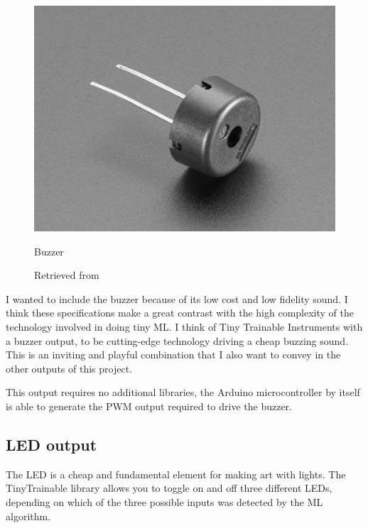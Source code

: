 \begin{figure}[ht]
  \centering
  \includegraphics[width=0.75\linewidth,height=0.25\textheight,keepaspectratio]{images/materials-adafruit-buzzer.jpg}
  \caption{Buzzer}
  \caption*{Retrieved from \cite{website-materials-adafruit-buzzer}}
  \label{fig:materials-adafruit-buzzer}
\end{figure}

I wanted to include the buzzer because of its low cost and low fidelity sound. I think these specifications make a great contrast with the high complexity of the technology involved in doing tiny \acrshort{ML}. I think of Tiny Trainable Instruments with a buzzer output, to be cutting-edge technology driving a cheap buzzing sound. This is an inviting and playful combination that I also want to convey in the other outputs of this project.

This output requires no additional libraries, the Arduino microcontroller by itself is able to generate the \acrfull{PWM} output required to drive the buzzer.

\subsection{LED output}

The \acrfull{LED} is a cheap and fundamental element for making art with lights. The TinyTrainable library allows you to toggle on and off three different LEDs, depending on which of the three possible inputs was detected by the \acrshort{ML} algorithm.

